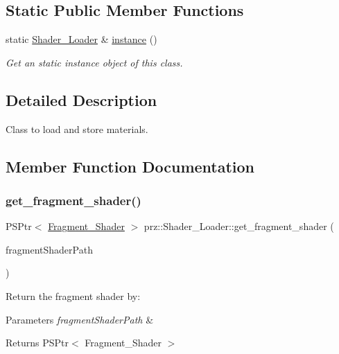 \subsection*{Static Public Member Functions}
\begin{DoxyCompactItemize}
\item 
static \mbox{\hyperlink{classprz_1_1_shader___loader}{Shader\+\_\+\+Loader}} \& \mbox{\hyperlink{classprz_1_1_shader___loader_adf553c01cabfb79286fa777e8d064b39}{instance}} ()
\begin{DoxyCompactList}\small\item\em Get an static instance object of this class. \end{DoxyCompactList}\end{DoxyCompactItemize}


\subsection{Detailed Description}
Class to load and store materials. 



\subsection{Member Function Documentation}
\mbox{\label{classprz_1_1_shader___loader_ac62062dc69aae5e6f709852507fcd581}} 
\subsubsection{\texorpdfstring{get\_fragment\_shader()}{get\_fragment\_shader()}}
{\footnotesize\ttfamily P\+S\+Ptr$<$ \mbox{\hyperlink{classprz_1_1_fragment___shader}{Fragment\+\_\+\+Shader}} $>$ prz\+::\+Shader\+\_\+\+Loader\+::get\+\_\+fragment\+\_\+shader (\begin{DoxyParamCaption}\item[{const P\+String \&}]{fragment\+Shader\+Path }\end{DoxyParamCaption})\hspace{0.3cm}{\ttfamily [inline]}}



Return the fragment shader by\+: 


\begin{DoxyParams}{Parameters}
{\em fragment\+Shader\+Path} & \\
\hline
\end{DoxyParams}
\begin{DoxyReturn}{Returns}
P\+S\+Ptr$<$ Fragment\+\_\+\+Shader $>$ 
\end{DoxyReturn}
\mbox{\label{classprz_1_1_shader___loader_a038668ed01e3660616bb5c9b4afc9867}} 

